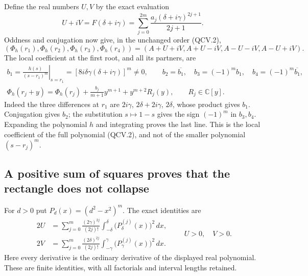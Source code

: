 Define the real numbers \(U,V\) by the exact evaluation
\[
 U+iV=F(\delta+i\gamma)
     =\sum_{j=0}^{2m}\frac{a_j(\delta+i\gamma)^{2j+1}}{2j+1}.
 \tag{QCV.7}
\]
Oddness and conjugation now give, in the unchanged order (QCV.2),
\[
 (\Phi_h(r_1),\Phi_h(r_2),\Phi_h(r_3),\Phi_h(r_4))
   =(A+U+iV,A+U-iV,A-U-iV,A-U+iV).
 \tag{QCV.8}
\]
The local coefficient at the first root, and all its partners, are
\[
 \begin{gathered}
 b_1=\left.\frac{h(s)}{(s-r_1)^m}\right|_{s=r_1}
       =[8i\delta\gamma(\delta+i\gamma)]^m\ne0,\qquad
 b_2=\overline{b_1},\quad b_3=(-1)^m b_1,
       \quad b_4=(-1)^m\overline{b_1},\\
 \Phi_h(r_j+y)=\Phi_h(r_j)
          +\frac{b_j}{m+1}y^{m+1}+y^{m+2}R_j(y),
       \qquad R_j\in\mathbb C[y].
 \end{gathered}
 \tag{QCV.9}
\]
Indeed the three differences at \(r_1\) are \(2i\gamma\),
\(2\delta+2i\gamma\), \(2\delta\), whose product gives \(b_1\).
Conjugation gives \(b_2\); the substitution \(s\mapsto1-s\) gives
the sign \((-1)^m\) in \(b_3,b_4\). Expanding the polynomial \(h\)
and integrating proves the last line. This is the local coefficient
of the full polynomial (QCV.2), and not of the smaller polynomial
\((s-r_j)^m\).

\subsection{A positive sum of squares proves that the rectangle does not collapse}

For \(d>0\) put \(P_d(x)=(d^2-x^2)^m\). The exact identities are
\[
 \boxed{\begin{aligned}
 2U&=\sum_{j=0}^{m}\frac{(2\gamma)^{2j}}{(2j)!}
         \int_{-\delta}^{\delta}\bigl(P_\delta^{(j)}(x)\bigr)^2\,dx,\\
 2V&=\sum_{j=0}^{m}\frac{(2\delta)^{2j}}{(2j)!}
         \int_{-\gamma}^{\gamma}\bigl(P_\gamma^{(j)}(x)\bigr)^2\,dx.
 \end{aligned}}
 \qquad U>0,\quad V>0.
 \tag{QCV.10}
\]
Here every derivative is the ordinary derivative of the displayed
real polynomial. These are finite identities, with all factorials
and interval lengths retained.


